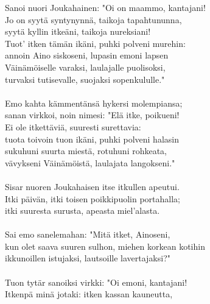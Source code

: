 Sanoi nuori Joukahainen: "Oi on maammo, kantajani!            \\
Jo on syytä syntynynnä, taikoja tapahtununna,                 \\
syytä kyllin itkeäni, taikoja nureksiani!                     \\
Tuot' itken tämän ikäni, puhki polveni murehin:               \\
annoin Aino siskoseni, lupasin emoni lapsen                   \\
Väinämöiselle varaksi, laulajalle puolisoksi,                 \\
turvaksi tutisevalle, suojaksi sopenkululle."                 \\
                                                              \\
Emo kahta kämmentänsä hykersi molempiansa;                    \\
sanan virkkoi, noin nimesi: "Elä itke, poikueni!              \\
Ei ole itkettäviä, suuresti surettavia:                       \\
tuota toivoin tuon ikäni, puhki polveni halasin               \\
sukuhuni suurta miestä, rotuhuni rohkeata,                    \\
vävykseni Väinämöistä, laulajata langokseni."                 \\
                                                              \\
Sisar nuoren Joukahaisen itse itkullen apeutui.               \\
Itki päivän, itki toisen poikkipuolin portahalla;             \\
itki suuresta surusta, apeasta miel'alasta.                   \\
                                                              \\
Sai emo sanelemahan: "Mitä itket, Ainoseni,                   \\
kun olet saava suuren sulhon, miehen korkean kotihin          \\
ikkunoillen istujaksi, lautsoille lavertajaksi?"              \\
                                                              \\
Tuon tytär sanoiksi virkki: "Oi emoni, kantajani!             \\
Itkenpä minä jotaki: itken kassan kauneutta,                  \\
